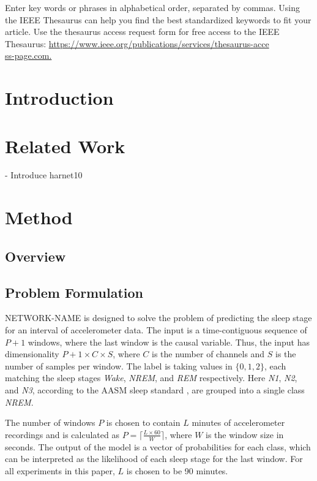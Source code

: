 \documentclass[journal,twoside,web]{ieeecolor}
\begin{document}
\begin{IEEEkeywords}
Enter key words or phrases in alphabetical order, separated by commas. Using the IEEE Thesaurus can help you find the best standardized keywords to fit your article. Use the thesaurus access request form for free access to the IEEE Thesaurus: \underline{https://www.ieee.org/publications/services/thesaurus-acce}\\
\underline{ss-page.com.}
\end{IEEEkeywords}

\section{Introduction}
\label{sec:introduction}


\section{Related Work}
- Introduce harnet10

\section{Method}
\subsection{Overview}
\subsection{Problem Formulation}
NETWORK-NAME is designed to solve the problem of predicting the sleep stage for an interval of accelerometer data. The input is a time-contiguous sequence of $P+1$ windows, where the last window is the causal variable. Thus, the input has dimensionality $P+1 \times C \times S$, where $C$ is the number of channels and $S$ is the number of samples per window. The label is taking values in $\{0,1,2\}$, each matching the sleep stages \textit{Wake}, \textit{NREM}, and \textit{REM} respectively. Here \textit{N1}, \textit{N2}, and \textit{N3}, according to the AASM sleep standard \cite{aasm}, are grouped into a single class \textit{NREM}.

The number of windows $P$ is chosen to contain $L$ minutes of accelerometer recordings and is calculated as $P = \lceil \frac{L \times 60}{W} \rceil$, where $W$ is the window size in seconds. The output of the model is a vector of probabilities for each class, which can be interpreted as the likelihood of each sleep stage for the last window. For all experiments in this paper, $L$ is chosen to be 90 minutes.
\end{document}
